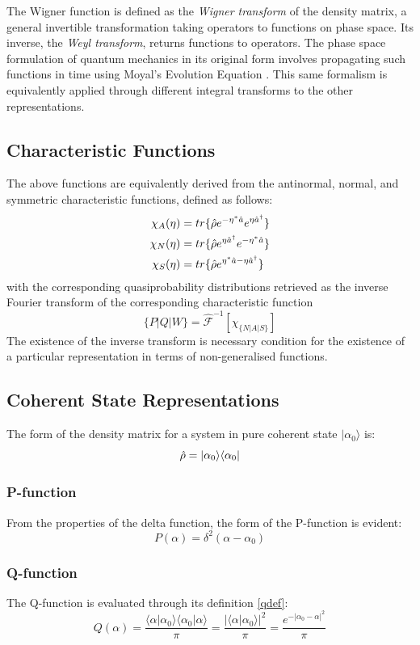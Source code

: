 The Wigner function is defined as the \emph{Wigner transform} of the density matrix, a general invertible transformation taking operators to functions on phase space. Its inverse, the \emph{Weyl transform}, returns functions to operators. The phase space formulation of quantum mechanics in its original form involves propagating such functions in time using Moyal's Evolution Equation \cite{Curtright2011}. This same formalism is equivalently applied  through different integral transforms to the other representations.
\subsection{Characteristic Functions}
The above functions are equivalently derived from the antinormal, normal, and symmetric characteristic functions, defined as follows:
\begin{align}
	\chi_{A} (\eta) &= tr\{\hat{\rho} e^{-\eta^* \hat{a}}e^{\eta \hat{a}^\dagger } \} \\
	\chi_{N} (\eta) &= tr\{\hat{\rho} e^{\eta \hat{a}^\dagger}e^{-\eta^* \hat{a} } \} \\
	\chi_{S} (\eta) &= tr\{\hat{\rho} e^{\eta^* \hat{a}-\eta \hat{a}^\dagger } \}
\end{align}
with the corresponding quasiprobability distributions retrieved as the inverse Fourier transform of the corresponding characteristic function
 \begin{equation}
 	\{P|Q|W\} = \hat{\mathscr{F}}^{-1} [\chi_{\{N|A|S\}}]
\end{equation}
The existence of the inverse transform is necessary condition for the existence of a particular representation in terms of non-generalised functions.
\subsection{Coherent State Representations}
The form of the density matrix for a system in pure coherent state $ | \alpha_0 \rangle $  is:
\begin{equation}
 	\hat{\rho} = | \alpha_0 \rangle \langle \alpha_0 |
 \end{equation}
 \subsubsection{P-function}
 From the properties of the delta function, the form of the P-function is evident:
\begin{equation}
	P(\alpha) = \delta^2(\alpha-\alpha_0)
\end{equation}
\subsubsection{Q-function}
The Q-function is evaluated through its definition \cref{qdef}:
\begin{equation}
	Q(\alpha) = \frac{\langle \alpha | \alpha_0 \rangle \langle \alpha_0 | \alpha \rangle}{\pi} = \frac{{|\langle \alpha | \alpha_0 \rangle |}^2}{\pi} =  \frac{e^{-{|\alpha_0 - \alpha |}^2}}{\pi}
\end{equation}
